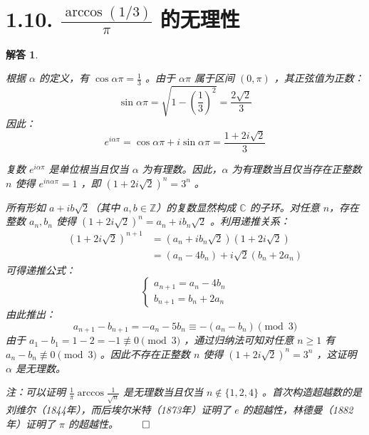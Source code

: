 \documentclass[12pt,UTF8]{ctexbook}
\theoremstyle{exercisestyle}
\theoremstyle{solutionstyle}
\newtheorem*{solution*}{解答}
\newenvironment{solution}
  {\begin{solution*}}
  {\hfill\ensuremath{\qed}\end{solution*}}
\begin{document}
\section{1.10. $\frac{\arccos (1/3)}{\pi}$ 的无理性}
\begin{solution}
\begin{subquestions}
\item 根据 $\alpha$ 的定义，有 $\cos \alpha \pi = \frac{1}{3}$ 。由于 $\alpha \pi$ 属于区间 $(0, \pi)$ ，其正弦值为正数：
$$
\sin \alpha \pi = \sqrt{1 - \left(\frac{1}{3}\right)^2} = \frac{2\sqrt{2}}{3}
$$
因此：
$$
e^{i\alpha\pi} = \cos \alpha \pi + i\sin \alpha \pi = \frac{1+2i\sqrt{2}}{3}
$$

\item 复数 $e^{i\alpha\pi}$ 是单位根当且仅当 $\alpha$ 为有理数。因此，$\alpha$ 为有理数当且仅当存在正整数 $n$ 使得 $e^{in\alpha\pi} = 1$ ，即 $(1+2i\sqrt{2})^n = 3^n$ 。

\item 所有形如 $a+ib\sqrt{2}$（其中 $a,b \in \mathbb{Z}$）的复数显然构成 $\mathbb{C}$ 的子环。对任意 $n$，存在整数 $a_n,b_n$ 使得 $(1+2i\sqrt{2})^n = a_n + ib_n\sqrt{2}$ 。利用递推关系：
$$
\begin{aligned}
(1+2i\sqrt{2})^{n+1} &= (a_n+ib_n\sqrt{2})(1+2i\sqrt{2}) \\
&= (a_n - 4b_n) + i\sqrt{2}(b_n + 2a_n)
\end{aligned}
$$
可得递推公式：
$$
\begin{cases}
a_{n+1} = a_n - 4b_n \\
b_{n+1} = b_n + 2a_n
\end{cases}
$$
由此推出：
$$
a_{n+1} - b_{n+1} = -a_n - 5b_n \equiv -(a_n - b_n) \pmod{3}
$$
由于 $a_1 - b_1 = 1 - 2 = -1 \not\equiv 0 \pmod{3}$ ，通过归纳法可知对任意 $n \geq 1$ 有 $a_n - b_n \not\equiv 0 \pmod{3}$ 。因此不存在正整数 $n$ 使得 $(1 + 2i\sqrt{2})^n = 3^n$ ，这证明 $\alpha$ 是无理数。
\end{subquestions}

注：可以证明 $\frac{1}{\pi}\arccos \frac{1}{\sqrt{n}}$ 是无理数当且仅当 $n \notin \{1, 2, 4\}$ 。首次构造超越数的是刘维尔（1844年），而后埃尔米特（1873年）证明了 $e$ 的超越性，林德曼（1882年）证明了 $\pi$ 的超越性。
\end{solution}
\end{document}
